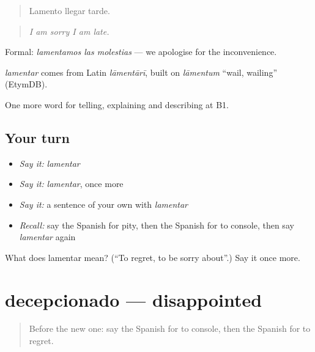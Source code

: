 \begin{quote}
Lamento llegar tarde.
\end{quote}

\begin{quote}
\emph{I am sorry I am late.}
\end{quote}

Formal: \emph{lamentamos las molestias} — we apologise for the inconvenience.

\begin{cousinweb}
\emph{lamentar} comes from Latin \emph{lāmentārī}, built on \emph{lāmentum} \textquotedblleft{}wail, wailing\textquotedblright{} (EtymDB).
\end{cousinweb}

\begin{grammarlens}[title={What you've built}]
One more word for telling, explaining and describing at B1.
\end{grammarlens}

\subsection*{Your turn}
\begin{itemize}
\raggedright
  \item \emph{Say it:} \emph{lamentar}
  \item \emph{Say it:} \emph{lamentar}, once more
  \item \emph{Say it:} a sentence of your own with \emph{lamentar}
  \item \emph{Recall:} say the Spanish for pity, then the Spanish for to console, then say \emph{lamentar} again
\end{itemize}

\begin{tcolorbox}[breakable,colback=teal!4,colframe=teal!35!black,title={Before you move on}]
What does lamentar mean? (\textquotedblleft{}To regret, to be sorry about\textquotedblright{}.) Say it once more.
\end{tcolorbox}
\section[decepcionado]{decepcionado — disappointed}

\label{lesson:ES-C716-decepcionado}



\begin{quote}
Before the new one: say the Spanish for to console, then the Spanish for to regret.
\end{quote}

